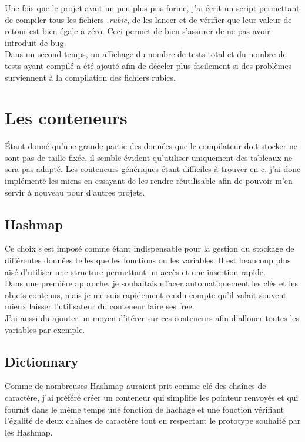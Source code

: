 \documentclass[12pt]{article}
\begin{document}
Une fois que le projet avait un peu plus pris forme, j'ai écrit un script
permettant de compiler tous les fichiers {\em.rubic}, de les lancer et de
vérifier que leur valeur de retour est bien égale à zéro. Ceci permet de bien
s'assurer de ne pas avoir introduit de bug.\\

Dans un second temps, un affichage du nombre de tests total et du nombre de
tests ayant compilé a été ajouté afin de déceler plus facilement si des
problèmes surviennent à la compilation des fichiers rubics.

\section{Les conteneurs}

Étant donné qu'une grande partie des données que le compilateur doit stocker
ne sont pas de taille fixée, il semble évident qu'utiliser uniquement des
tableaux ne sera pas adapté. Les conteneurs génériques étant difficiles à
trouver en c, j'ai donc implémenté les miens en essayant de les rendre
réutilisable afin de pouvoir m'en servir à nouveau pour d'autres projets.

\subsection{Hashmap}
Ce choix s'est imposé comme étant indispensable pour la gestion du stockage
de différentes données telles que les fonctions ou les variables. Il est
beaucoup plus aisé d'utiliser une structure permettant un accès et une
insertion rapide.\\

Dans une première approche, je souhaitais effacer automatiquement les clés et
les objets contenus, mais je me suis rapidement rendu compte qu'il valait
souvent mieux laisser l'utilisateur du conteneur faire ses free.\\

J'ai aussi du ajouter un moyen d'itérer sur ces conteneurs afin d'allouer
toutes les variables par exemple.

\subsection{Dictionnary}
Comme de nombreuses Hashmap auraient prit comme clé des chaînes de caractère,
j'ai préféré créer un conteneur qui simplifie les pointeur renvoyés et
qui fournit dans le même temps une fonction de hachage et une fonction
vérifiant l'égalité de deux chaînes de caractère tout en respectant le
prototype souhaité par les Hashmap.
\end{document}
